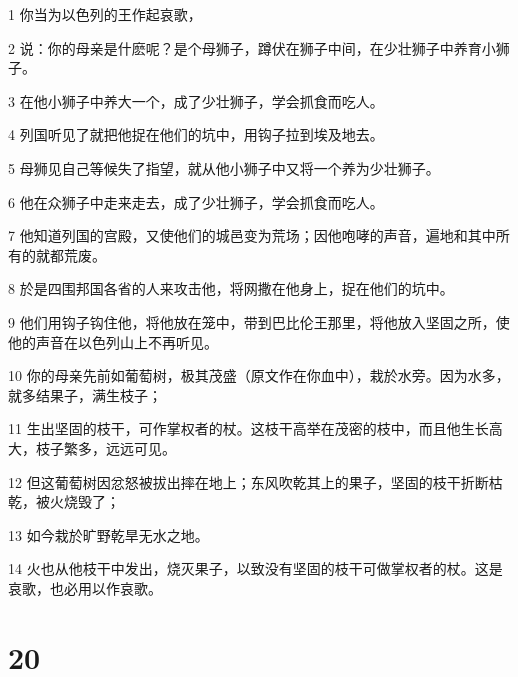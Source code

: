 \par 1 你当为以色列的王作起哀歌，
\par 2 说：你的母亲是什麽呢？是个母狮子，蹲伏在狮子中间，在少壮狮子中养育小狮子。
\par 3 在他小狮子中养大一个，成了少壮狮子，学会抓食而吃人。
\par 4 列国听见了就把他捉在他们的坑中，用钩子拉到埃及地去。
\par 5 母狮见自己等候失了指望，就从他小狮子中又将一个养为少壮狮子。
\par 6 他在众狮子中走来走去，成了少壮狮子，学会抓食而吃人。
\par 7 他知道列国的宫殿，又使他们的城邑变为荒场；因他咆哮的声音，遍地和其中所有的就都荒废。
\par 8 於是四围邦国各省的人来攻击他，将网撒在他身上，捉在他们的坑中。
\par 9 他们用钩子钩住他，将他放在笼中，带到巴比伦王那里，将他放入坚固之所，使他的声音在以色列山上不再听见。
\par 10 你的母亲先前如葡萄树，极其茂盛（原文作在你血中），栽於水旁。因为水多，就多结果子，满生枝子；
\par 11 生出坚固的枝干，可作掌权者的杖。这枝干高举在茂密的枝中，而且他生长高大，枝子繁多，远远可见。
\par 12 但这葡萄树因忿怒被拔出摔在地上；东风吹乾其上的果子，坚固的枝干折断枯乾，被火烧毁了；
\par 13 如今栽於旷野乾旱无水之地。
\par 14 火也从他枝干中发出，烧灭果子，以致没有坚固的枝干可做掌权者的杖。这是哀歌，也必用以作哀歌。

\chapter{20}

